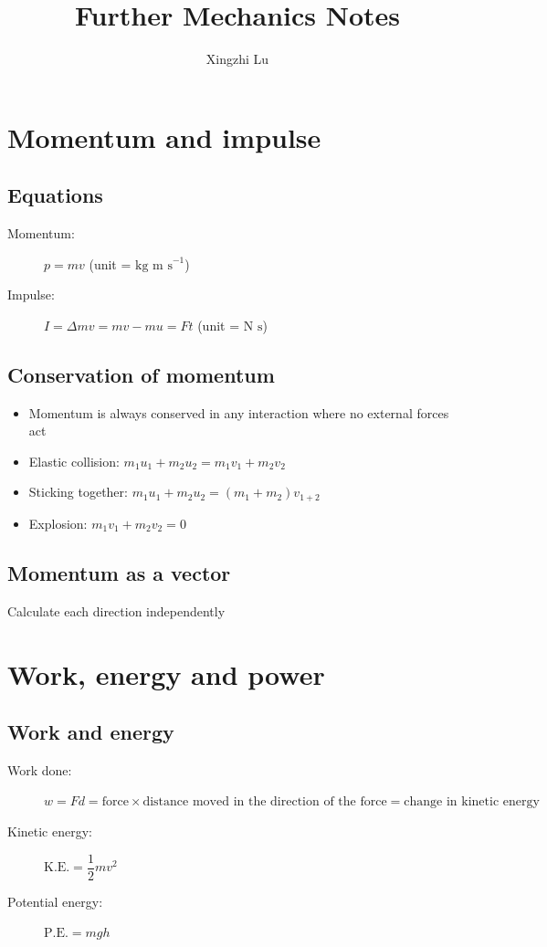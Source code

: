 \documentclass[11pt, A4paper]{article}
\title{Further Mechanics Notes}
\author{Xingzhi Lu}
\begin{document}
	\maketitle
	\section[1 Momentum and impulse]{Momentum and impulse}
	\subsection{Equations}
	\begin{description}
		\item[Momentum:] $p=mv$ (unit = $\text{kg m s}^{-1}$)
		\item[Impulse:] $I=\Delta mv=mv-mu=Ft$ (unit = $\text{N s}$)
	\end{description}
	
	\subsection{Conservation of momentum}
	\begin{itemize}
		\item Momentum is always conserved in any interaction where no external forces act
		\item Elastic collision: $m_1u_1+m_2u_2=m_1v_1+m_2v_2$
		\item Sticking together: $m_1u_1+m_2u_2=(m_1+m_2)v_{1+2}$
		\item Explosion: $m_1v_1+m_2v_2=0$
	\end{itemize}
	
	\subsection{Momentum as a vector}
	Calculate each direction independently
	
	
	
	\section[2 Work, energy and power]{Work, energy and power}
	\subsection{Work and energy}
	\begin{description}
		\item[Work done:] $w=Fd=\text{force}\times\text{distance moved in the direction of the force}=\text{change in kinetic energy}$
		\item[Kinetic energy:] $\text{K.E.}=\dfrac{1}{2}mv^2$
		\item[Potential energy:] $\text{P.E.}=mgh$
	\end{description}
\end{document}
